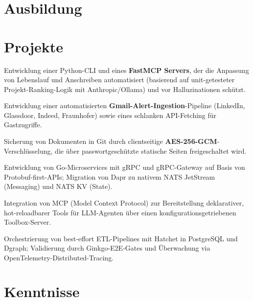 \documentclass[10pt,a4paper]{resume}
\begin{document}
\section{Ausbildung}

\vspace{2pt}

\section{Projekte}

\bullets
  \item Entwicklung einer Python-CLI und eines \textbf{FastMCP Servers}, der die Anpassung von Lebenslauf und Anschreiben automatisiert (basierend auf unit-getesteter Projekt-Ranking-Logik mit Anthropic/Ollama) und vor Halluzinationen schützt.
  \item Entwicklung einer automatisierten \textbf{Gmail-Alert-Ingestion}-Pipeline (LinkedIn, Glassdoor, Indeed, Fraunhofer) sowie eines schlanken API-Fetching für Gastzugriffe.
  \item Sicherung von Dokumenten in Git durch clientseitige \textbf{AES-256-GCM}-Verschlüsselung, die über passwortgeschützte statische Seiten freigeschaltet wird.
\bulletsend
\vspace{1.0pt}
\bullets
  \item Entwicklung von Go-Microservices mit gRPC und gRPC-Gateway auf Basis von Protobuf-first-APIs; Migration von Dapr zu nativem NATS JetStream (Messaging) und NATS KV (State).
  \item Integration von MCP (Model Context Protocol) zur Bereitstellung deklarativer, hot-reloadbarer Tools für LLM-Agenten über einen konfigurationsgetriebenen Toolbox-Server.
  \item Orchestrierung von best-effort ETL-Pipelines mit Hatchet in PostgreSQL und Dgraph; Validierung durch Ginkgo-E2E-Gates und Überwachung via OpenTelemetry-Distributed-Tracing.
\bulletsend

\section{Kenntnisse}
\end{document}

